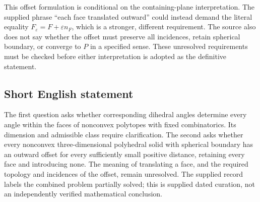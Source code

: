\documentclass[11pt]{article}
\begin{document}
This offset formulation is conditional on the containing-plane interpretation. The supplied phrase ``each face translated outward'' could instead demand the literal equality \(F_\varepsilon=F+\varepsilon n_F\), which is a stronger, different requirement. The source also does not say whether the offset must preserve all incidences, retain spherical boundary, or converge to \(P\) in a specified sense. These unresolved requirements must be checked before either interpretation is adopted as the definitive statement.
\subsection{Short English statement}
The first question asks whether corresponding dihedral angles determine every angle within the faces of nonconvex polytopes with fixed combinatorics. Its dimension and admissible class require clarification. The second asks whether every nonconvex three-dimensional polyhedral solid with spherical boundary has an outward offset for every sufficiently small positive distance, retaining every face and introducing none. The meaning of translating a face, and the required topology and incidences of the offset, remain unresolved. The supplied record labels the combined problem partially solved; this is supplied dated curation, not an independently verified mathematical conclusion.
\end{document}
